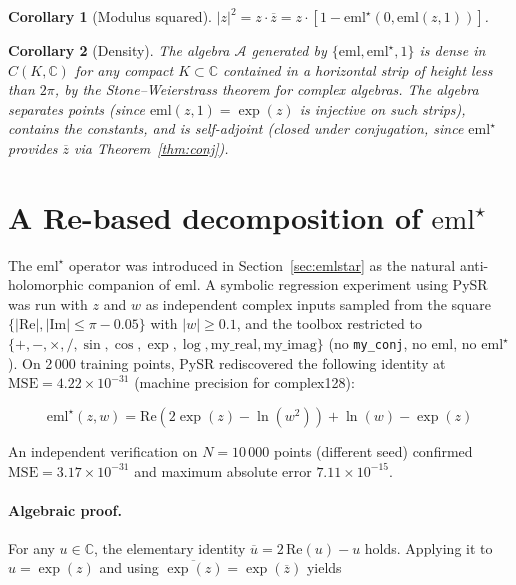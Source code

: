 \documentclass[12pt,a4paper]{article}
\newtheorem{corollary}{Corollary}
\newcommand{\emlstar}{\mathrm{eml}^{\star}}
\newcommand{\eml}{\mathrm{eml}}
\newcommand{\conj}[1]{\overline{#1}}
\begin{document}
\begin{corollary}[Modulus squared]
$|z|^2 = z \cdot \conj{z} = z \cdot [1 - \emlstar(0, \eml(z,1))]$.
\end{corollary}

\begin{corollary}[Density]
\label{cor:density}
The algebra $\mathcal{A}$ generated by $\{\eml, \emlstar, 1\}$ is dense in
$C(K, \mathbb{C})$ for any compact $K \subset \mathbb{C}$ contained
in a horizontal strip of height less than $2\pi$,
by the Stone--Weierstrass theorem for complex algebras.
The algebra separates points (since $\eml(z,1) = \exp(z)$ is injective
on such strips), contains the constants, and is self-adjoint
(closed under conjugation, since $\emlstar$ provides $\conj{z}$
via Theorem~\ref{thm:conj}).
\end{corollary}

\section{A Re-based decomposition of $\emlstar$}
\label{sec:re-decomposition}

The $\emlstar$ operator was introduced in Section~\ref{sec:emlstar}
as the natural anti-holomorphic companion of $\eml$.
A symbolic regression experiment using PySR was run with $z$ and $w$
as independent complex inputs sampled from the square
$\{|\mathrm{Re}|, |\mathrm{Im}| \leq \pi - 0.05\}$ with $|w| \geq 0.1$,
and the toolbox restricted to
$\{+, -, \times, /, \sin, \cos, \exp, \log,
  \mathrm{my\_real}, \mathrm{my\_imag}\}$
(no \texttt{my\_conj}, no $\eml$, no $\emlstar$).
On 2\,000 training points, PySR rediscovered the following
identity at $\mathrm{MSE} = 4.22 \times 10^{-31}$
(machine precision for complex128):

\begin{equation}
\boxed{\,\emlstar(z, w) = \mathrm{Re}\!\left(2\exp(z) - \ln(w^2)\right)
+ \ln(w) - \exp(z)\,}
\label{eq:re-decomp}
\end{equation}

An independent verification on $N = 10\,000$ points
(different seed) confirmed $\mathrm{MSE} = 3.17 \times 10^{-31}$
and maximum absolute error $7.11 \times 10^{-15}$.

\paragraph{Algebraic proof.}
For any $u \in \mathbb{C}$, the elementary identity
$\conj{u} = 2\,\mathrm{Re}(u) - u$ holds.
Applying it to $u = \exp(z)$ and using
$\conj{\exp(z)} = \exp(\conj{z})$ yields
\end{document}
